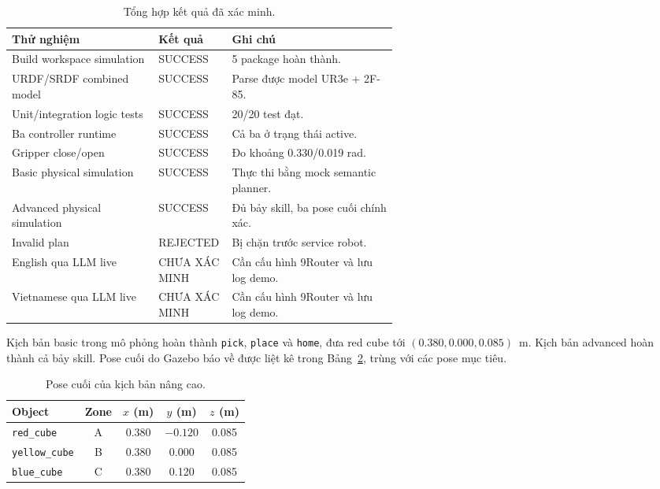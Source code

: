 \documentclass[12pt,a4paper]{article}
\begin{document}
\begin{table}[H]
  \centering
  \caption{Tổng hợp kết quả đã xác minh.}
  \label{tab:results}
  \begin{tabularx}{\linewidth}{@{}p{0.38\linewidth}p{0.19\linewidth}X@{}}
    \toprule
    \textbf{Thử nghiệm} & \textbf{Kết quả} & \textbf{Ghi chú} \\
    \midrule
    Build workspace simulation & SUCCESS & 5 package hoàn thành. \\
    URDF/SRDF combined model & SUCCESS & Parse được model UR3e + 2F-85. \\
    Unit/integration logic tests & SUCCESS & 20/20 test đạt. \\
    Ba controller runtime & SUCCESS & Cả ba ở trạng thái active. \\
    Gripper close/open & SUCCESS & Đo khoảng 0.330/0.019 rad. \\
    Basic physical simulation & SUCCESS & Thực thi bằng mock semantic planner. \\
    Advanced physical simulation & SUCCESS & Đủ bảy skill, ba pose cuối chính xác. \\
    Invalid plan & REJECTED & Bị chặn trước service robot. \\
    English qua LLM live & CHƯA XÁC MINH & Cần cấu hình 9Router và lưu log demo. \\
    Vietnamese qua LLM live & CHƯA XÁC MINH & Cần cấu hình 9Router và lưu log demo. \\
    \bottomrule
  \end{tabularx}
\end{table}

Kịch bản basic trong mô phỏng hoàn thành \texttt{pick}, \texttt{place} và \texttt{home}, đưa red cube tới $(0.380,0.000,0.085)$~m. Kịch bản advanced hoàn thành cả bảy skill. Pose cuối do Gazebo báo về được liệt kê trong Bảng~\ref{tab:advanced-result}, trùng với các pose mục tiêu.

\begin{table}[H]
  \centering
  \caption{Pose cuối của kịch bản nâng cao.}
  \label{tab:advanced-result}
  \begin{tabular}{@{}lcccc@{}}
    \toprule
    \textbf{Object} & \textbf{Zone} & $x$ (m) & $y$ (m) & $z$ (m) \\
    \midrule
    \texttt{red\_cube}    & A & 0.380 & $-0.120$ & 0.085 \\
    \texttt{yellow\_cube} & B & 0.380 & 0.000 & 0.085 \\
    \texttt{blue\_cube}   & C & 0.380 & 0.120 & 0.085 \\
    \bottomrule
  \end{tabular}
\end{table}
\end{document}
